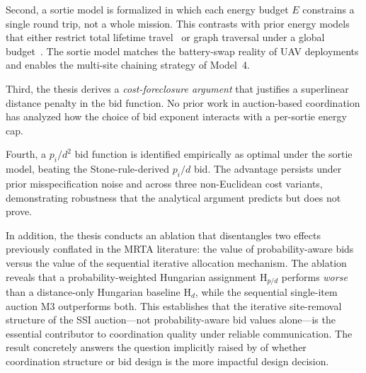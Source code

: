 \begin{doublespacing}
Second, a sortie model is formalized in which each energy budget $E$
constrains a single round trip, not a whole mission. This contrasts
with prior energy models that either restrict total lifetime
travel~\citep{Betke1995} or graph traversal under a global
budget~\citep{Das2017}. The sortie model matches the battery-swap
reality of UAV deployments and enables the multi-site chaining
strategy of Model~4.

Third, the thesis derives a \emph{cost-foreclosure argument} that
justifies a superlinear distance penalty in the bid function. No prior
work in auction-based coordination has analyzed how the choice of bid
exponent interacts with a per-sortie energy cap.

Fourth, a $p_i / d^2$ bid function is identified empirically as
optimal under the sortie model, beating the Stone-rule-derived $p_i/d$
bid. The advantage persists under prior misspecification noise and
across three non-Euclidean cost variants, demonstrating robustness
that the analytical argument predicts but does not prove.

In addition, the thesis conducts an ablation that disentangles two
effects previously conflated in the MRTA literature: the value of
probability-aware bids versus the value of the sequential iterative
allocation mechanism.
The ablation reveals that a probability-weighted Hungarian assignment
H$_{p/d}$ performs \emph{worse} than a distance-only Hungarian baseline
H$_d$, while the sequential single-item auction M3 outperforms both.
This establishes that the iterative site-removal structure of the SSI
auction---not probability-aware bid values alone---is the essential
contributor to coordination quality under reliable communication.
The result concretely answers the question implicitly raised by
\citet{OtteKuhlman2020} of whether coordination structure or bid
design is the more impactful design decision.

\end{doublespacing}
